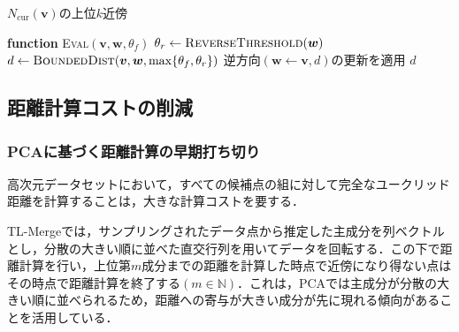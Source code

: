 \documentclass[submit,techrep,noauthor]{ipsj}
\newcommand{\N}{\mathbb{N}}
\newcommand{\vb}[1]{\boldsymbol{#1}}
\begin{document}
\begin{algorithm}[t]
\begin{algorithmic}[1]
        \RETURN $N_{\mathrm{cur}}(\vb{v})$の上位$k$近傍
            
        \item[] \textbf{function}
        \textsc{Eval}$(\vb{v},\vb{w},\theta_f)$
            \STATE $\theta_r \gets
                \textsc{ReverseThreshold}(\vb{w})$
            \STATE $d \gets \textsc{BoundedDist}(\vb{v},\vb{w},\max\{\theta_f,\theta_r\})$
                \STATE 逆方向$(\vb{w}\leftarrow\vb{v},d)$の更新を適用
            \ENDIF
            \RETURN $d$
    \end{algorithmic}
\end{algorithm}

\subsection{距離計算コストの削減}
\label{subsec:cost}
\subsubsection{PCAに基づく距離計算の早期打ち切り}
高次元データセットにおいて，すべての候補点の組に対して完全なユークリッド距離を計算することは，大きな計算コストを要する．

TL-Mergeでは，サンプリングされたデータ点から推定した主成分を列ベクトルとし，分散の大きい順に並べた直交行列を用いてデータを回転する．この下で距離計算を行い，上位第$m$成分までの距離を計算した時点で近傍になり得ない点はその時点で距離計算を終了する$(m\in\N)$．これは，PCAでは主成分が分散の大きい順に並べられるため，距離への寄与が大きい成分が先に現れる傾向があることを活用している．

\end{document}
